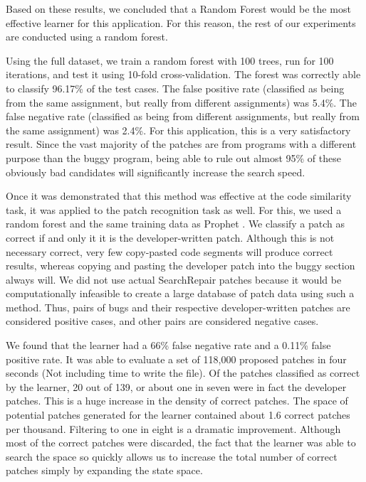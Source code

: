 \documentclass{paper}
\begin{document}
Based on these results, we concluded that a Random Forest would be the most effective learner for this application. 
For this reason, the rest of our experiments are conducted using a random forest.


Using the full dataset, we train a random forest with 100 trees, run for 100 iterations, and test it using 10-fold cross-validation. 
The forest was correctly able to classify 96.17\% of the test cases. The false positive rate (classified as being from the same assignment, but really from different assignments) was 5.4\%. 
The false negative rate (classified as being from different assignments, but really from the same assignment)  was 2.4\%. 
For this application, this is a very satisfactory result. 
Since the vast majority of the patches are from programs with a different purpose than the buggy program, being able to rule out almost 95\% of these obviously bad candidates will significantly increase the search speed. 

Once it was demonstrated that this method was effective at the code similarity task, it was applied to the patch recognition task as well. 
For this, we used a random forest and the same training data as Prophet \cite{Prophet}. 
We classify a patch as correct if and only it it is the developer-written patch. Although this is not necessary correct, very few copy-pasted code segments will produce correct results, whereas copying and pasting the developer patch into the buggy section always will. 
We did not use actual SearchRepair patches because it would be computationally infeasible to create a large database of patch data using such a method. 
Thus, pairs of bugs and their respective developer-written patches are considered positive cases, and other pairs are considered negative cases. 


We found that the learner had a 66\% false negative rate and a 0.11\% false positive rate. 
It was able to evaluate a set of 118,000 proposed patches in four seconds (Not including time to write the file). 
Of the patches classified as correct by the learner, 20 out of 139, or about one in seven were in fact the developer patches. 
This is a huge increase in the density of correct patches. 
The space of potential patches generated for the learner contained about 1.6 correct patches per thousand. 
Filtering to one in eight is a dramatic improvement. 
Although most of the correct patches were discarded, the fact that the learner was able to search the space so quickly allows us to increase the total number of correct patches simply by expanding the state space. 
\end{document}
